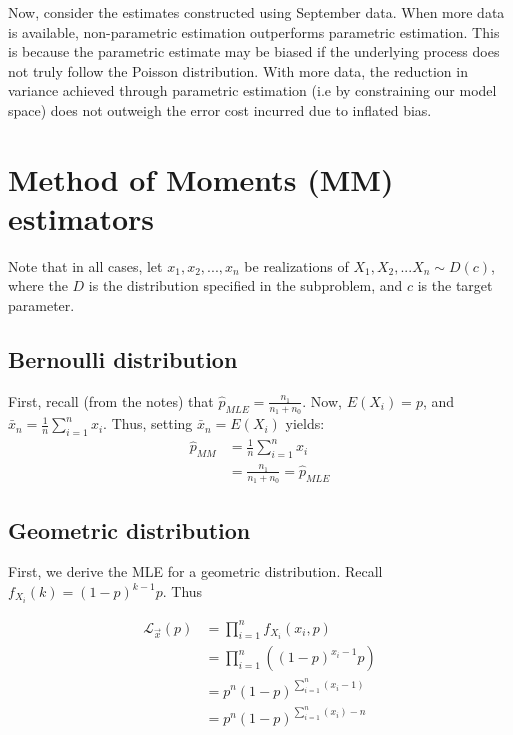 \documentclass[paper=a4, fontsize=11pt]{scrartcl} %
\numberwithin{equation}{section} %
\numberwithin{figure}{section} %
\numberwithin{table}{section} %
\begin{document}
Now, consider the estimates constructed using September data. When more data is available, non-parametric estimation outperforms parametric estimation. This is because the parametric estimate may be biased if the underlying process does not truly follow the Poisson distribution. With more data, the reduction in variance achieved through parametric estimation (i.e by constraining our model space) does not outweigh the error cost incurred due to inflated bias.



\section{Method of Moments (MM) estimators}

Note that in all cases, let $x_1, x_2, ..., x_n$ be realizations of $X_1, X_2, ... X_n \sim D(c)$, where the $D$ is the distribution specified in the subproblem, and $c$ is the target parameter.

\subsection{Bernoulli distribution}

First, recall (from the notes) that $\hat{p}_{MLE} = \frac{n_1}{n_1 + n_0}$. Now, $E(X_i) = p$, and $\bar{x}_n = \frac{1}{n} \sum_{i = 1}^{n}x_i$. Thus, setting $\bar{x}_n = E(X_i)$ yields:
\begin{align*}
\hat{p}_{MM} &= \frac{1}{n} \sum_{i = 1}^{n}x_i \\
   &= \frac{n_1}{n_1 + n_0} = \hat{p}_{MLE}
\end{align*}

\subsection{Geometric distribution}

First, we derive the MLE for a geometric distribution. Recall $f_{X_i}(k) = (1-p)^{k-1} p$. Thus

\begin{align*}
\mathcal{L}_{\vec{x}} (p) &= \prod_{i = 1}^{n} f_{X_i}(x_i, p) \\
   &= \prod_{i = 1}^{n} \left((1-p)^{x_i-1} p\right) \\
   &= p^n (1-p)^{\sum_{i=1}^n (x_i -1)} \\ 
   &= p^n (1-p)^{\sum_{i=1}^n (x_i) -n} \\ 
\end{align*}
\end{document}
